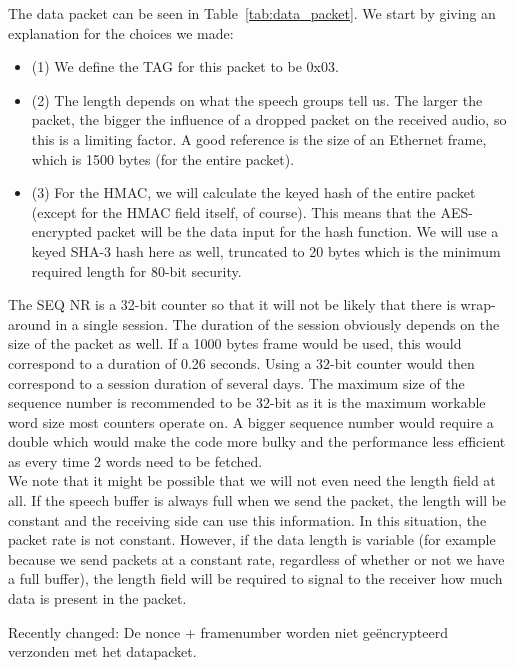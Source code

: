 \documentclass[a4paper]{article}
\begin{document}
The data packet can be seen in Table~\ref{tab:data_packet}. We start by giving an explanation for the choices we made:

\begin{itemize}
    \item (1) We define the TAG for this packet to be 0x03.
    \item (2) The length depends on what the speech groups tell us. The larger the packet, the bigger the influence of a dropped packet on the received audio, so this is a limiting factor. A good reference is the size of an Ethernet frame, which is 1500 bytes (for the entire packet).
    \item (3) For the HMAC, we will calculate the keyed hash of the entire packet (except for the HMAC field itself, of course). This means that the AES-encrypted packet will be the data input for the hash function. We will use a keyed SHA-3 hash here as well, truncated to 20 bytes which is the minimum required length for 80-bit security.
\end{itemize}

The SEQ NR is a 32-bit counter so that it will not be likely that there is wrap-around in a single session. The duration of the session obviously depends on the size of the packet as well. If a 1000 bytes frame would be used, this would correspond to a duration of 0.26 seconds. Using a 32-bit counter would then correspond to a session duration of several days. The maximum size of the sequence number is recommended to be 32-bit as it is the maximum workable word size most counters operate on. A bigger sequence number would require a double which would make the code more bulky and the performance less efficient as every time 2 words need to be fetched.\\

We note that it might be possible that we will not even need the length field at all. If the speech buffer is always full when we send the packet, the length will be constant and the receiving side can use this information. In this situation, the packet rate is not constant. However, if the data length is variable (for example because we send packets at a constant rate, regardless of whether or not we have a full buffer), the length field will be required to signal to the receiver how much data is present in the packet.

{\color{red}Recently changed: De nonce + framenumber worden niet geëncrypteerd verzonden met het datapacket.}
\end{document}
